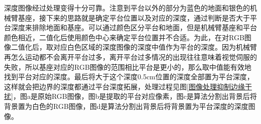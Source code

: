 \documentclass[fontset=fandol,type=bachelor,campus=harbin]{hithesisbook}
\begin{document}
深度图像经过处理变得十分可靠。注意到平台以外的部分为蓝色的地面和银色的机械臂基座，接下来的思路就是确定平台位置以及对应的深度，通过判断是否大于平台深度来排除地面和基座。可以通过颜色区分平台和地面，但是机械臂基座和平台颜色相近，二值化后使用颜色中心来确定平台位置并不合适。为此，在对RGB图像二值化后，取对应白色区域的深度图像的深度中值作为平台的深度。因为机械臂再怎么运动都不会离开平台过多，离开平台过多情况的出现往往意味着视觉伺服的失败，所以基座对应的RGB图像的范围相比平台是更小的，那么取中值能有效地找到平台对应的深度。最后将大于这个深度0.5cm位置的深度全部置为平台深度，这样就会把边界的深度都通过平台深度拓展，处理过程见图\ref{图像处理抑制边缘干扰}，图a是原始RGB图像，图b是提取的平台对应像素，图c是算法分割出背景后将背景置为白色的RGB图像，图d是算法分割出背景后将背景置为平台深度的深度图像。
\newpage
\begin{figure}[h]
	\centering
\end{figure}
\end{document}

